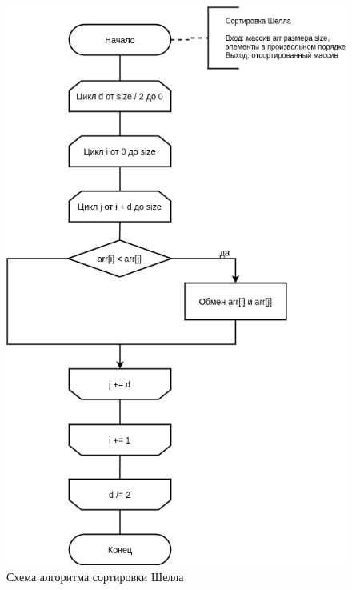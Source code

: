 \begin{figure}[H]
	\begin{center}
		\includegraphics[scale=0.5]{img/shell_sort.png}
	\end{center}
	\captionsetup{justification=centering}
	\caption{Схема алгоритма сортировки Шелла}
	\label{img:shell_sort}
\end{figure}

\newpage

